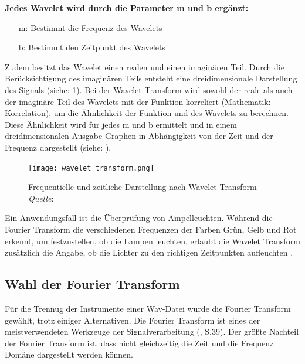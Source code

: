 \textbf{Jedes Wavelet wird durch die Parameter m und b ergänzt:}

%
\begin{itemize}
    \item[m:] Bestimmt die Frequenz des Wavelets
    \item[b:] Bestimmt den Zeitpunkt des Wavelets
\end{itemize}
%

Zudem besitzt das Wavelet einen realen und einen imaginären Teil. Durch die Berücksichtigung des imaginären Teils entsteht eine dreidimensionale Darstellung des Signals (siehe: \cref{fig:wavelet_transform}). Bei der Wavelet Transform wird sowohl der reale als auch der imaginäre Teil des Wavelets mit der Funktion korreliert (Mathematik: Korrelation), um die Ähnlichkeit der Funktion und des Wavelets zu berechnen. Diese Ähnlichkeit wird für jedes m und b ermittelt und in einem dreidimensionalen Ausgabe-Graphen in Abhängigkeit von der Zeit und der Frequenz dargestellt (siehe: \cite{wavelet_transform}).

%
\begin{figure}[h]
    \texttt{[image: wavelet\_transform.png]}
    \caption[Frequentielle und zeitliche Darstellung nach Wavelet Transform]{Frequentielle und zeitliche Darstellung nach Wavelet Transform\\\hspace{\textwidth}\textit{Quelle}: \cite{wavelet_transform}}
    \label{fig:wavelet_transform}
\end{figure}
%

Ein Anwendungsfall ist die Überprüfung von Ampelleuchten. Während die Fourier Transform die verschiedenen Frequenzen der Farben Grün, Gelb und Rot erkennt, um festzustellen, ob die Lampen leuchten, erlaubt die Wavelet Transform zusätzlich die Angabe, ob die Lichter zu den richtigen Zeitpunkten aufleuchten \parencite{wavelets}.

%
\subsection{Wahl der Fourier Transform}
%

Für die Trennug der Instrumente einer Wav-Datei wurde die Fourier Transform gewählt, trotz einiger Alternativen. Die Fourier Transform ist eines der meistverwendeten Werkzeuge der Signalverarbeitung (\cite{fundamentals_of_music_processing}, S.39). Der größte Nachteil der Fourier Transform ist, dass nicht gleichzeitig die Zeit und die Frequenz Domäne dargestellt werden können.

